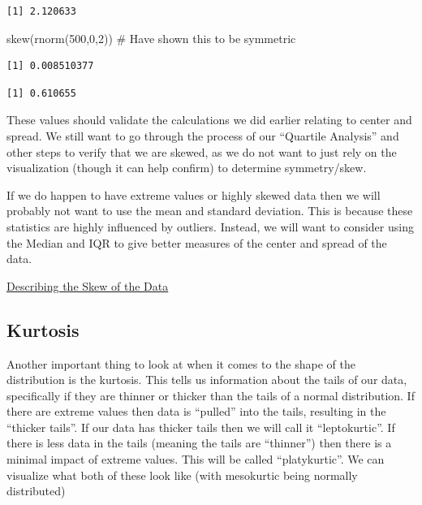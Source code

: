 \documentclass[
  letterpaper,
  DIV=11,
  numbers=noendperiod]{scrreprt}
\newenvironment{Shaded}{\begin{snugshade}}{\end{snugshade}}
\newcommand{\CommentTok}[1]{\textcolor[rgb]{0.37,0.37,0.37}{#1}}
\newcommand{\DecValTok}[1]{\textcolor[rgb]{0.68,0.00,0.00}{#1}}
\newcommand{\FunctionTok}[1]{\textcolor[rgb]{0.28,0.35,0.67}{#1}}
\newcommand{\NormalTok}[1]{\textcolor[rgb]{0.00,0.23,0.31}{#1}}
\newcommand{\SpecialCharTok}[1]{\textcolor[rgb]{0.37,0.37,0.37}{#1}}
\begin{document}
\begin{verbatim}
[1] 2.120633
\end{verbatim}

\begin{Shaded}
\begin{Highlighting}[]
\FunctionTok{skew}\NormalTok{(}\FunctionTok{rnorm}\NormalTok{(}\DecValTok{500}\NormalTok{,}\DecValTok{0}\NormalTok{,}\DecValTok{2}\NormalTok{)) }\CommentTok{\# Have shown this to be symmetric}
\end{Highlighting}
\end{Shaded}

\begin{verbatim}
[1] 0.008510377
\end{verbatim}

\begin{Shaded}
\end{Shaded}

\begin{verbatim}
[1] 0.610655
\end{verbatim}

These values should validate the calculations we did earlier relating to
center and spread. We still want to go through the process of our
``Quartile Analysis'' and other steps to verify that we are skewed, as
we do not want to just rely on the visualization (though it can help
confirm) to determine symmetry/skew.

If we do happen to have extreme values or highly skewed data then we
will probably not want to use the mean and standard deviation. This is
because these statistics are highly influenced by outliers. Instead, we
will want to consider using the Median and IQR to give better measures
of the center and spread of the data.

\begin{watch}{}{}
    \href{https://youtu.be/_VHtL0hgaKA}{Describing the Skew of the Data}
\end{watch}

\subsection{Kurtosis}\label{kurtosis}

Another important thing to look at when it comes to the shape of the
distribution is the kurtosis. This tells us information about the tails
of our data, specifically if they are thinner or thicker than the tails
of a normal distribution. If there are extreme values then data is
``pulled'' into the tails, resulting in the ``thicker tails''. If our
data has thicker tails then we will call it ``leptokurtic''. If there is
less data in the tails (meaning the tails are ``thinner'') then there is
a minimal impact of extreme values. This will be called ``platykurtic''.
We can visualize what both of these look like (with mesokurtic being
normally distributed)
\end{document}

